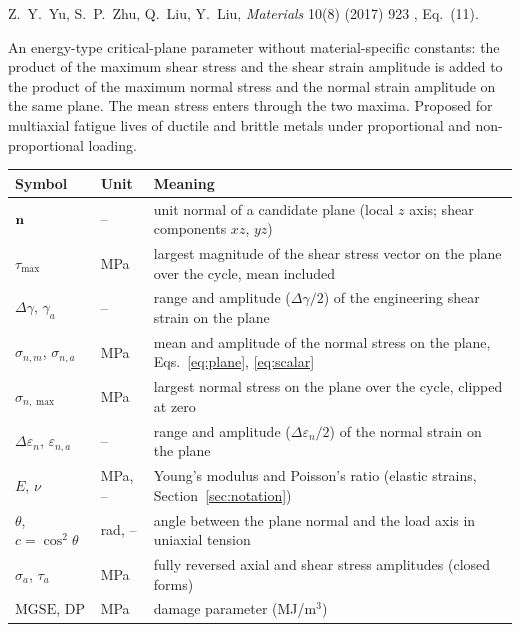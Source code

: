 \label{sheet:MGSE_YU}

 Z.~Y.~Yu, S.~P.~Zhu, Q.~Liu, Y.~Liu, \emph{Materials} 10(8) (2017) 923
\cite{yu2017}, Eq.~(11).

 An energy-type critical-plane parameter without material-specific
constants: the product of the maximum shear stress and the shear strain amplitude is added to the
product of the maximum normal stress and the normal strain amplitude on the same plane. The mean
stress enters through the two maxima. Proposed for multiaxial fatigue lives of ductile and brittle
metals under proportional and non-proportional loading.

\begin{center}\small
\begin{tabular}{@{}llp{100mm}@{}}
\toprule
Symbol & Unit & Meaning\\\midrule
$\mathbf n$ & -- & unit normal of a candidate plane (local $z$ axis; shear components $xz$, $yz$)\\
$\tau_{\max}$ & MPa & largest magnitude of the shear stress vector on the plane over the cycle, mean included\\
$\Delta\gamma$, $\gamma_a$ & -- & range and amplitude ($\Delta\gamma/2$) of the engineering shear strain on the plane\\
$\sigma_{n,m}$, $\sigma_{n,a}$ & MPa & mean and amplitude of the normal stress on the plane, Eqs.~\eqref{eq:plane}, \eqref{eq:scalar}\\
$\sigma_{n,\max}$ & MPa & largest normal stress on the plane over the cycle, clipped at zero\\
$\Delta\varepsilon_n$, $\varepsilon_{n,a}$ & -- & range and amplitude ($\Delta\varepsilon_n/2$) of the normal strain on the plane\\
$E$, $\nu$ & MPa, -- & Young's modulus and Poisson's ratio (elastic strains, Section~\ref{sec:notation})\\
$\theta$, $c=\cos^2\theta$ & rad, -- & angle between the plane normal and the load axis in uniaxial tension\\
$\sigma_a$, $\tau_a$ & MPa & fully reversed axial and shear stress amplitudes (closed forms)\\
$\mathrm{MGSE}$, $\mathrm{DP}$ & MPa & damage parameter (MJ/m$^3$)\\
\bottomrule
\end{tabular}
\end{center}

